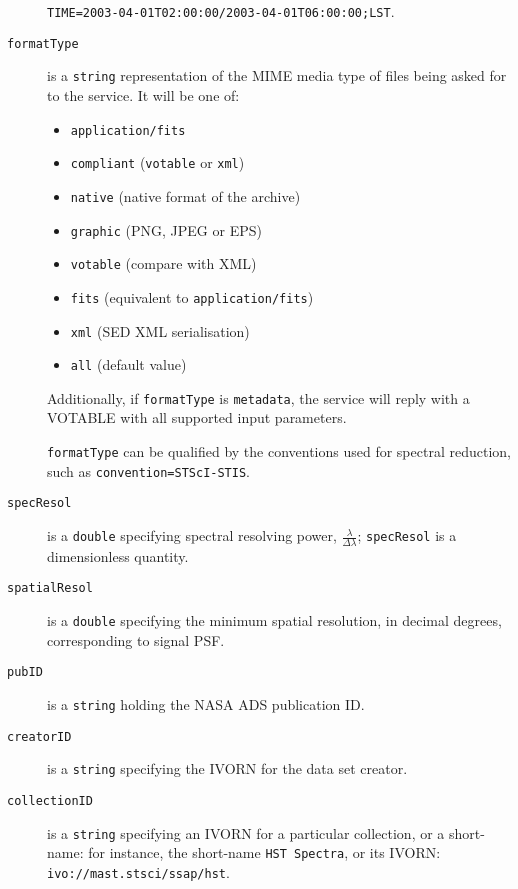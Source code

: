 \begin{description}
		\texttt{TIME=2003-04-01T02:00:00/2003-04-01T06:00:00;LST}.
	
		\item[\texttt{formatType}] is a \texttt{string} 
		representation of the MIME media type of files being asked 
		for to the service. It will be one of:
		
		\begin{itemize}
			\item \texttt{application/fits}
			\item \texttt{compliant} (\texttt{votable} or 
									  \texttt{xml})
			\item \texttt{native} (native format of the archive)
			\item \texttt{graphic} (PNG, JPEG or EPS)
			\item \texttt{votable} (compare with XML)
			\item \texttt{fits} (equivalent to 
								 \texttt{application/fits})
			\item \texttt{xml} (SED XML serialisation)
			\item \texttt{all} (default value)
		\end{itemize}
		
		Additionally, if \texttt{formatType} is 
		\texttt{metadata}, the service will reply with a 
		VOTABLE with all supported input parameters.
		
		\texttt{formatType} can be qualified by the conventions 
		used for spectral reduction, such as 
		\texttt{convention=STScI-STIS}.
		
		\item[\texttt{specResol}] is a \texttt{double} specifying 
		spectral resolving power, $\frac{\lambda}{\Delta\lambda}$; 
		\texttt{specResol} is a dimensionless quantity.
		
		\item[\texttt{spatialResol}] is a \texttt{double} specifying 
		the minimum spatial resolution, in decimal degrees, 
		corresponding to signal PSF.
		
		\item[\texttt{pubID}] is a \texttt{string} holding the 
		NASA ADS publication ID.
		
		\item[\texttt{creatorID}] is a \texttt{string} specifying 
		the IVORN for the data set creator.
		
		\item[\texttt{collectionID}] is a \texttt{string} specifying 
		an IVORN for a particular collection, or a short-name: for 
		instance, the short-name \texttt{HST Spectra}, or its IVORN:
		\texttt{ivo://mast.stsci/ssap/hst}.
		

\end{description}
